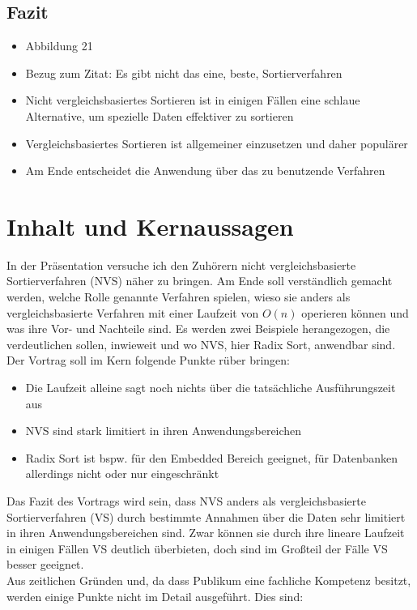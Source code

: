 \documentclass[a4paper, 12pt, oneside]{article}
\begin{document}
    \subsection{Fazit}

   \begin{itemize}
        \item Abbildung 21
        \item Bezug zum Zitat: Es gibt nicht das eine, beste, Sortierverfahren
        \item Nicht vergleichsbasiertes Sortieren ist in einigen Fällen eine schlaue Alternative, um spezielle Daten effektiver zu sortieren
        \item Vergleichsbasiertes Sortieren ist allgemeiner einzusetzen und daher populärer
        \item Am Ende entscheidet die Anwendung über das zu benutzende Verfahren
    \end{itemize}


    \clearpage
    \section{Inhalt und Kernaussagen}

    In der Präsentation versuche ich den Zuhörern nicht vergleichsbasierte Sortierverfahren (NVS)
    näher zu bringen. Am Ende soll verständlich gemacht werden, welche Rolle genannte Verfahren 
    spielen, wieso sie anders als vergleichsbasierte Verfahren mit einer Laufzeit von $O(n)$ operieren 
    können und was ihre Vor- und Nachteile sind. Es werden zwei Beispiele herangezogen, die verdeutlichen 
    sollen, inwieweit und wo NVS, hier Radix Sort, anwendbar sind. \\

    Der Vortrag soll im Kern folgende Punkte rüber bringen:

    \begin{itemize}
        \item Die Laufzeit alleine sagt noch nichts über die tatsächliche Ausführungszeit aus
        \item NVS sind stark limitiert in ihren Anwendungsbereichen
        \item Radix Sort ist bspw. für den Embedded Bereich geeignet, für Datenbanken allerdings nicht oder nur eingeschränkt
    \end{itemize}

    Das Fazit des Vortrags wird sein, dass NVS anders als vergleichsbasierte Sortierverfahren (VS) 
    durch bestimmte Annahmen über die Daten sehr limitiert in ihren Anwendungsbereichen sind. 
    Zwar können sie durch ihre lineare Laufzeit in einigen Fällen VS deutlich überbieten, 
    doch sind im Großteil der Fälle VS besser geeignet. \\
    Aus zeitlichen Gründen und, da dass Publikum eine fachliche Kompetenz besitzt, werden einige 
    Punkte nicht im Detail ausgeführt. Dies sind:
\end{document}
